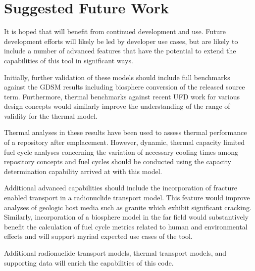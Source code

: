 \section{Suggested Future Work}
It is hoped that \Cyder will benefit from continued development and use. Future 
development efforts will likely be led by developer use cases, but are likely 
to include a number of advanced features that have the potential to extend the 
capabilities of this tool in significant ways. 

Initially, further validation of these models should include full benchmarks 
against the \gls{GDSM} results including biosphere conversion of the released 
source term.  Furthermore, thermal benchmarks against recent \gls{UFD} work for 
various design concepts would similarly improve the understanding of the range 
of validity for the thermal model. 

Thermal analyses in these results have been used to assess thermal performance 
of a repository after emplacement. However, dynamic, thermal capacity limited 
fuel cycle analyses concerning the variation of necessary cooling times among 
repository concepts and fuel cycles should be conducted using the capacity 
determination capability arrived at with this model.  

Additional advanced capabilities should include the incorporation of fracture 
enabled transport in a radionuclide transport model. This feature would improve 
analyses of geologic host media such as granite which exhibit significant 
cracking. Similarly, incorporation of a biosphere model in the far field would 
substantively benefit the calculation of fuel cycle metrics related to human and 
environmental effects and will support myriad expected use cases of the tool.

Additional radionuclide transport models, thermal transport models, and 
supporting data will enrich the capabilities of this code. 

